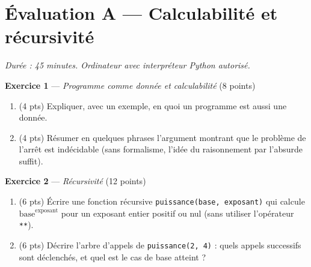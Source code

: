 \section*{Évaluation A --- Calculabilité et récursivité}
\textit{Durée : 45 minutes. Ordinateur avec interpréteur Python autorisé.}


\bigskip

\textbf{Exercice 1} --- \textit{Programme comme donnée et calculabilité} \hfill (8 points)

\begin{enumerate}
  \item (4 pts) Expliquer, avec un exemple, en quoi un programme est aussi une donnée.
  \item (4 pts) Résumer en quelques phrases l'argument montrant que le problème de l'arrêt est indécidable (sans formalisme, l'idée du raisonnement par l'absurde suffit).
\end{enumerate}

\bigskip

\textbf{Exercice 2} --- \textit{Récursivité} \hfill (12 points)

\begin{enumerate}
  \item (6 pts) Écrire une fonction récursive \lstinline{puissance(base, exposant)} qui calcule $\text{base}^{\text{exposant}}$ pour un exposant entier positif ou nul (sans utiliser l'opérateur \lstinline{**}).
  \item (6 pts) Décrire l'arbre d'appels de \lstinline{puissance(2, 4)} : quels appels successifs sont déclenchés, et quel est le cas de base atteint ?
\end{enumerate}

